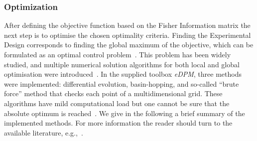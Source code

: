\documentclass[10pt,A4paper]{article}
\begin{document}
\subsubsection*{Optimization}
After defining the objective function based on the Fisher Information matrix the next step is to optimise the chosen optimality criteria.
Finding the Experimental Design corresponds to finding the global maximum of the objective, which can be formulated as an optimal control problem~\cite{espie_optimal_1989}.
This problem has been widely studied, and multiple numerical solution algorithms for both local and global optimisation were introduced~\cite{esposito_global_2000, bangaImprovingFoodProcessing2003, ali_numerical_1997, runarsson_stochastic_2000}.
In the supplied toolbox {\it eDPM}, three methods were implemented: differential evolution, basin-hopping, and so-called “brute force” method that checks each point of a multidimensional grid.
These algorithms have mild computational load but one cannot be sure that the absolute optimum is reached~\cite{balsa-cantoe.bangaj.r.COMPUTINGOPTIMALDYNAMIC2008}.
We give in the following a brief summary of the implemented methods.
For more information the reader should turn to the available literature, e.g.,~\cite{banga_global_1996, banga_dynamic_2005}.
\newline
\end{document}
